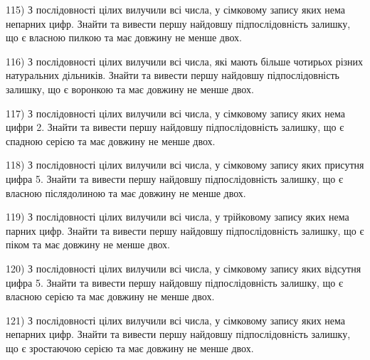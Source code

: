 \documentclass[11pt, ukrainian]{article}
\begin{document}
\par
\vspace{0.9cm}
115) \space 
З послідовності цілих вилучили всі числа, у сімковому запису яких нема непарних цифр. Знайти та вивести першу найдовшу підпослідовність залишку, що є власною пилкою та має довжину не менше двох.

\par
\vspace{0.9cm}
116) \space 
З послідовності цілих вилучили всі числа, які мають більше чотирьох різних натуральних дільників. Знайти та вивести першу найдовшу підпослідовність залишку, що є воронкою та має довжину не менше двох.

\par
\vspace{0.9cm}
117) \space 
З послідовності цілих вилучили всі числа, у сімковому запису яких нема цифри 2. Знайти та вивести першу найдовшу підпослідовність залишку, що є спадною серією та має довжину не менше двох.

\par
\vspace{0.9cm}
118) \space 
З послідовності цілих вилучили всі числа, у сімковому запису яких присутня цифра 5. Знайти та вивести першу найдовшу підпослідовність залишку, що є власною післядолиною та має довжину не менше двох.

\par
\vspace{0.9cm}
119) \space 
З послідовності цілих вилучили всі числа, у трійковому запису яких нема парних цифр. Знайти та вивести першу найдовшу підпослідовність залишку, що є піком та має довжину не менше двох.

\par
\vspace{0.9cm}
120) \space 
З послідовності цілих вилучили всі числа, у сімковому запису яких відсутня цифра 5. Знайти та вивести першу найдовшу підпослідовність залишку, що є власною серією та має довжину не менше двох.

\par
\vspace{0.9cm}
121) \space 
З послідовності цілих вилучили всі числа, у сімковому запису яких нема непарних цифр. Знайти та вивести першу найдовшу підпослідовність залишку, що є зростаючою серією та має довжину не менше двох.
\end{document}
